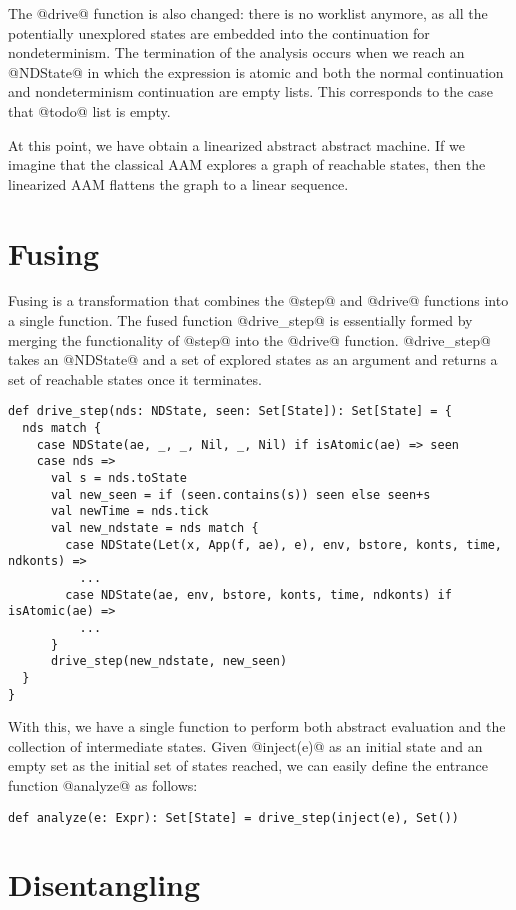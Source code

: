 \documentclass[acmsmall]{acmart}\settopmatter{}
\begin{document}
The @drive@ function is also changed: there is no worklist anymore, as all the
potentially unexplored states are embedded into the continuation for
nondeterminism.
The termination of the analysis occurs when we reach an @NDState@ in which the expression
is atomic and both the normal continuation and nondeterminism continuation are
empty lists. This corresponds to the case that @todo@ list is empty.

At this point, we have obtain a linearized abstract abstract machine. If we imagine that the
classical AAM explores a graph of reachable states, then the linearized AAM flattens the
graph to a linear sequence.

\section{Fusing} \label{fusing}

Fusing is a transformation that combines the @step@ and @drive@ functions into a single
function.
The fused function @drive_step@ is essentially formed by merging the functionality of
@step@ into the @drive@ function.
@drive_step@ takes an @NDState@ and a set of explored states as an argument
and returns a set of reachable states once it terminates.

\begin{lstlisting}
def drive_step(nds: NDState, seen: Set[State]): Set[State] = {
  nds match {
    case NDState(ae, _, _, Nil, _, Nil) if isAtomic(ae) => seen
    case nds =>
      val s = nds.toState
      val new_seen = if (seen.contains(s)) seen else seen+s
      val newTime = nds.tick
      val new_ndstate = nds match {
        case NDState(Let(x, App(f, ae), e), env, bstore, konts, time, ndkonts) =>
          ...
        case NDState(ae, env, bstore, konts, time, ndkonts) if isAtomic(ae) =>
          ...
      }
      drive_step(new_ndstate, new_seen)
  }
}
\end{lstlisting}

With this, we have a single function to perform both abstract evaluation and the collection of
intermediate states. Given @inject(e)@ as an initial state and an empty set as the
initial set of states reached, we can easily define the entrance function @analyze@ as
follows:

\begin{lstlisting}
def analyze(e: Expr): Set[State] = drive_step(inject(e), Set())
\end{lstlisting}

\section{Disentangling} \label{disen}
\end{document}
